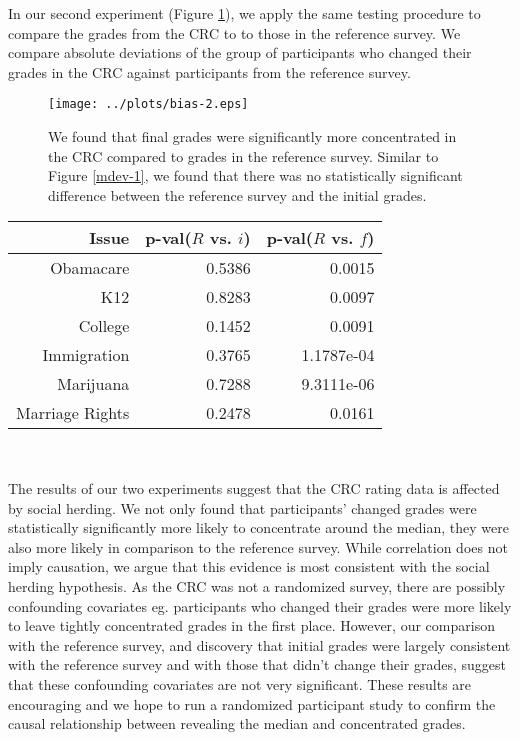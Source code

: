 In our second experiment (Figure \ref{mdev-2}), we apply the same testing procedure to compare the grades from the CRC to to those in the reference survey.
We compare absolute deviations of the group of participants who changed their grades in the CRC against participants from the reference survey.
\begin{figure}[h]
\hspace{-2.6em}
    \texttt{[image: ../plots/bias-2.eps]}
      \caption{We found that final grades were significantly more concentrated in the CRC compared to grades in the reference survey. Similar to Figure \ref{mdev-1}, we found that there was no statistically significant difference between the reference survey and the initial grades.}
      \label{mdev-2}
\end{figure}

{\centering
\scriptsize
\begin{tabular}[!ht] { r | r | r }
\label{ref-1}
  Issue & p-val($R$ vs. $i$) & p-val($R$ vs. $f$) \\
  \hline
  \hline
  Obamacare &  0.5386 & 0.0015 \\
  \hline
  K12 & 0.8283 & 0.0097 \\
  \hline
  College & 0.1452 & 0.0091 \\
  \hline
  Immigration & 0.3765 & 1.1787e-04\\
  \hline
  Marijuana & 0.7288 & 9.3111e-06\\
  \hline
  Marriage Rights & 0.2478 & 0.0161 \\
\end{tabular}\\[1\baselineskip]
}

The results of our two experiments suggest that the CRC rating data is affected by social herding.
We not only found that participants' changed grades were statistically significantly more likely to concentrate around the median, they were also more likely in comparison to the reference survey.
While correlation does not imply causation, we argue that this evidence is most consistent with the social herding hypothesis.
As the CRC was not a randomized survey, there are possibly confounding covariates eg. participants who changed their grades were more likely to leave tightly concentrated grades in the first place.
However, our comparison with the reference survey, and discovery that initial grades were largely consistent with the reference survey and with those that didn't change their grades, suggest that these confounding covariates are not very significant.
These results are encouraging and we hope to run a randomized participant study to confirm the causal relationship between revealing the median and concentrated grades.

